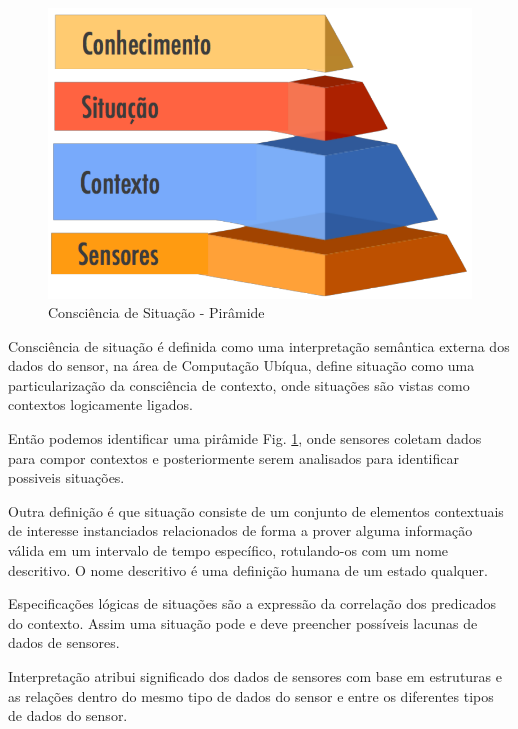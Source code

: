 \documentclass[12pt,a4paper,compsoc]{IEEEtran}
\begin{document}
  \begin{figure}[ht]
  \centerline{\includegraphics[scale=.20]{imagens/consciencia-de-situacao-piramide}}
  \caption{Consciência de Situação - Pirâmide \cite{almeida2013}}
  \label{cs-piramide}
  \end{figure}

  Consciência de situação é definida como uma interpretação semântica externa dos dados do sensor,
  na área de Computação Ubíqua, \cite{anagnostopoulos2006} define situação como uma 
  particularização da consciência de contexto, onde situações são vistas como contextos logicamente
  ligados.
  
  Então podemos identificar uma pirâmide Fig. \ref{cs-piramide}, onde sensores coletam dados para
  compor contextos e posteriormente serem analisados para identificar possiveis situações.

  Outra definição é que situação consiste de um conjunto de elementos contextuais de interesse 
  instanciados relacionados de forma a prover alguma informação válida em um intervalo de tempo 
  específico, rotulando-os com um nome descritivo. O nome descritivo é uma definição humana de um 
  estado qualquer.
  
  Especificações lógicas de situações são a expressão da correlação dos predicados do contexto. 
  Assim uma situação pode e deve preencher possíveis lacunas de dados de sensores.
  
  Interpretação atribui significado dos dados de sensores com base em estruturas e as relações 
  dentro do mesmo tipo de dados do sensor e entre os diferentes tipos de dados do sensor.
  
\end{document}
